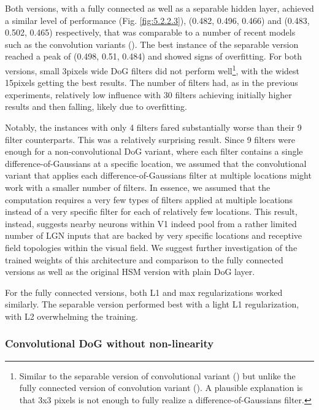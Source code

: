 Both versions, with a fully connected as well as a separable hidden layer, achieved a similar level of performance (Fig. \ref{fig:5.2.2.3}), (0.482, 0.496, 0.466) and (0.483, 0.502, 0.465) respectively, that was comparable to a number of recent models such as the convolution variants (). The best instance of the separable version reached a peak of (0.498, 0.51, 0.484) and showed signs of overfitting. For both versions, small 3pixels wide DoG filters did not perform well\footnote{Similar to the separable version of convolutional variant () but unlike the fully connected version of convolution variant (). A plausible explanation is that 3x3 pixels is not enough to fully realize a difference-of-Gaussians filter.}, with the widest 15pixels getting the best results. The number of filters had, as in the previous experiments, relatively low influence with 30 filters achieving initially higher results and then falling, likely due to overfitting.

Notably, the instances with only 4 filters fared substantially worse than their 9 filter counterparts. This was a relatively surprising result. Since 9 filters were enough for a non-convolutional DoG variant, where each filter contains a single difference-of-Gaussians at a specific location, we assumed that the convolutional variant that applies each difference-of-Gaussians filter at multiple locations might work with a smaller number of filters. In essence, we assumed that the computation requires a very few types of filters applied at multiple locations instead of a very specific filter for each of relatively few locations. This result, instead, suggests nearby neurons within V1 indeed pool from a rather limited number of LGN inputs that are backed by very specific locations and receptive field topologies within the visual field. We suggest further investigation of the trained weights of this architecture and comparison to the fully connected versions as well as the original HSM version with plain DoG layer.

For the fully connected versions, both L1 and max regularizations worked similarly. The separable version performed best with a light L1 regularization, with L2 overwhelming the training.

\subsubsection{Convolutional DoG without non-linearity}\label{ex:2.2.4}

